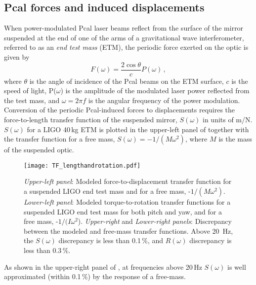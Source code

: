 \documentclass[12pt,a4paper,final]{iopart}
\begin{document}
\subsection{Pcal forces and induced displacements}
\label{subsec:IntroForces}
%
When power-modulated Pcal laser beams reflect from the surface of the mirror suspended at the end of one of the arms of a gravitational wave interferometer, referred to as an {\em end test mass} (ETM), the periodic force exerted on the optic is given by 
%
\begin{equation}
F(\omega)  = \frac{2 \cos\theta}{c} P(\omega) \, ,
\label{eq:force}
\end{equation}
%
where $\theta$ is the angle of incidence of the Pcal beams on the ETM surface, $c$ is the speed of light, P($\omega$) is the amplitude of the modulated laser power reflected from the test mass, and  $\omega = 2\pi f$ is the angular frequency of the power modulation. 
Conversion of the periodic Pcal-induced forces to displacements requires the force-to-length transfer function of the suspended mirror, $S(\omega)$ in units of m/N. $S(\omega)$ for a LIGO 40\,kg ETM is plotted in the upper-left panel of  together with the transfer function for a free mass, $S(\omega) = -1/(M\omega^2)$, where $M$ is the mass of the suspended optic.
%
\begin{figure}[t]%
    \begin{center}
    \texttt{[image: TF\_lengthandrotation.pdf]}
    \caption{{\em Upper-left panel}: Modeled force-to-displacement transfer function for a suspended LIGO end test mass and for a free mass, -$1/(M \omega^2)$.  {\em Lower-left panel}: Modeled torque-to-rotation transfer functions for a suspended LIGO end test mass for both pitch and yaw, and for a free mass, -$1/(I \omega^2$). {\em Upper-right} and {\em Lower-right panels}: Discrepancy between the modeled and free-mass transfer functions. Above 20~Hz, the $S(\omega)$ discrepancy is less than 0.1\,\%, and $R(\omega)$ discrepancy is less than 0.3\,\%.}%
    \label{fig:TF}
    \end{center}
\end{figure}
%
As shown in the upper-right panel of , at frequencies above 20\,Hz $S(\omega)$ is well approximated (within 0.1\,\%) by the response of a free-mass.
\end{document}
